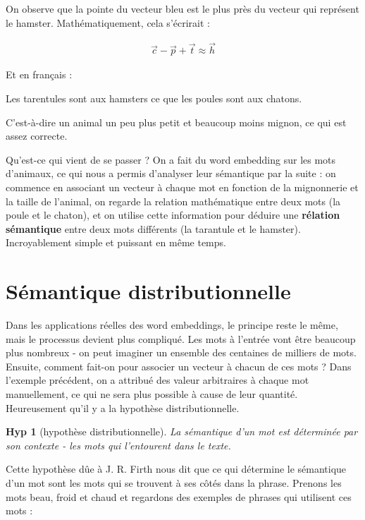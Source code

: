 \documentclass[11pt, a4paper]{report}
\newtheorem{hyp}{Hyp}[section]
\begin{document}
On observe que la pointe du vecteur bleu est le plus près du vecteur qui représent le hamster.
Mathématiquement, cela s'écrirait :

\begin{align*}
  \vec{c} - \vec{p} + \vec{t} \approx \vec{h} 
\end{align*}

Et en français : 

\begin{center}
  Les tarentules sont aux hamsters ce que les poules sont aux chatons. 
\end{center}

C'est-à-dire un animal un peu plus petit et beaucoup moins mignon, ce qui est assez 
correcte. 

Qu'est-ce qui vient de se passer ? On a fait du word embedding sur les 
mots d'animaux, ce qui nous a permis d'analyser leur sémantique par la suite : 
on commence en associant un vecteur à chaque mot en fonction de la mignonnerie et la 
taille de l'animal, on regarde la relation mathématique entre deux mots
(la poule et le chaton), et on utilise cette information pour déduire une \textbf{rélation sémantique} entre deux mots différents
(la tarantule et le hamster). Incroyablement simple et puissant en même temps.

\section{Sémantique distributionnelle}
Dans les applications réelles des word embeddings, le principe reste le même, mais le processus devient plus 
compliqué. Les mots à l'entrée vont être beaucoup plus nombreux - on peut imaginer un ensemble 
des centaines de milliers de mots. Ensuite, comment fait-on pour associer un vecteur à chacun
de ces mots ? Dans l'exemple précédent, on a attribué des valeur arbitraires à chaque mot 
manuellement, ce qui ne sera plus possible à cause de leur quantité. Heureusement qu'il y a la 
hypothèse distributionnelle. 

\begin{hyp}[hypothèse distributionnelle]
  La sémantique d'un mot est déterminée par son contexte - les mots qui l'entourent dans 
  le texte. 
\end{hyp}

Cette hypothèse dûe à J. R. Firth nous dit que ce qui détermine le sémantique d'un mot 
sont les mots qui se trouvent à ses côtés dans la phrase. Prenons les mots 
beau, froid et chaud et regardons des exemples de 
phrases qui utilisent ces mots : 
\end{document}
